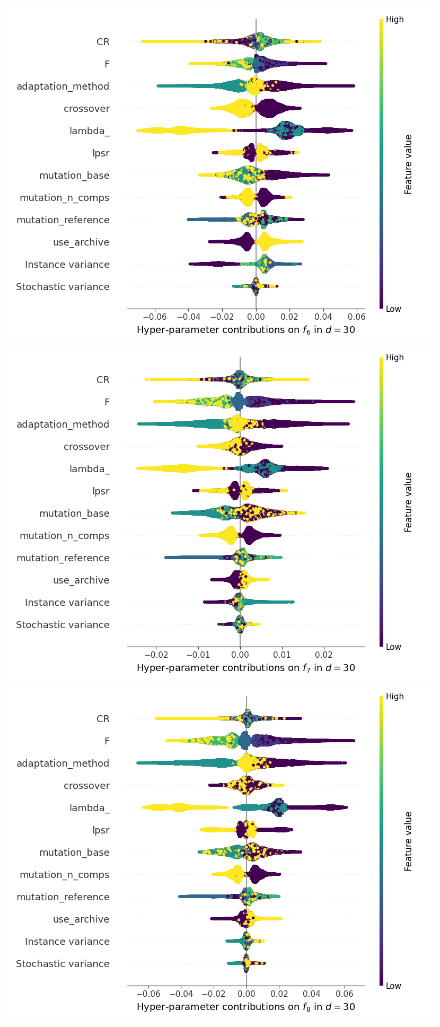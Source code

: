 \begin{figure}[t]
	\includegraphics[height=0.15\textheight,trim=60mm 0mm 30mm 0mm,clip]{de_img_new/img_summary_f6_d30.png}
	\includegraphics[height=0.15\textheight,trim=60mm 0mm 30mm 0mm,clip]{de_img_new/img_summary_f7_d30.png}
	\includegraphics[height=0.15\textheight,trim=60mm 0mm 0mm 0mm,clip]{de_img_new/img_summary_f8_d30.png}

\end{figure}
